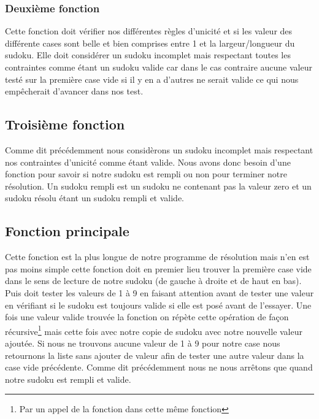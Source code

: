 \subsubsection{Deuxième fonction}

Cette fonction doit vérifier nos différentes règles d'unicité et si les valeur des différente cases sont belle et bien comprises entre 1 et la largeur/longueur du sudoku. Elle doit considérer un sudoku incomplet mais respectant toutes les contraintes comme étant un sudoku valide car dans le cas contraire aucune valeur testé sur la première case vide si il y en a d'autres ne serait valide ce qui nous empêcherait d'avancer dans nos test.\newline

\subsection{Troisième fonction}

Comme dit précédemment nous considèrons un sudoku incomplet mais respectant nos contraintes d'unicité comme étant valide. Nous avons donc besoin d'une fonction pour savoir si notre sudoku est rempli ou non pour terminer notre résolution. Un sudoku rempli est un sudoku ne contenant pas la valeur zero et un sudoku résolu étant un sudoku rempli et valide.\newline

\subsection{Fonction principale}

Cette fonction est la plus longue de notre programme de résolution mais n'en est pas moins simple cette fonction doit en premier lieu trouver la première case vide dans le sens de lecture de notre sudoku (de gauche à droite et de haut en bas).\newline
Puis doit tester les valeurs de 1 à 9 en faisant attention avant de tester une valeur en vérifiant si le sudoku est toujours valide si elle est posé avant de l'essayer.\newline
Une fois une valeur valide trouvée la fonction on répète cette opération de façon récursive\footnote{Par un appel de la fonction dans cette même fonction} mais cette fois avec notre copie de sudoku avec notre nouvelle valeur ajoutée.\newline
Si nous ne trouvons aucune valeur de 1 à 9 pour notre case nous retournons la liste sans ajouter de valeur afin de tester une autre valeur dans la case vide précédente.\newline
Comme dit précédemment nous ne nous arrêtons que quand notre sudoku est rempli et valide.\newline

